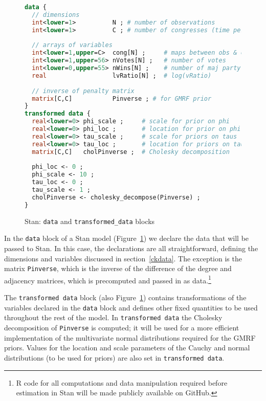 \begin{figure}[h]
\begin{lstlisting}[language=Stan, frame=trBL]
data {
  // dimensions 
  int<lower=1>          N ; # number of observations 
  int<lower=1>          C ; # number of congresses (time periods)
  
  // arrays of variables 
  int<lower=1,upper=C>  cong[N] ;     # maps between obs & congress
  int<lower=1,upper=56> nVotes[N] ;   # number of votes
  int<lower=0,upper=55> nWins[N] ;    # number of maj party victories
  real                  lvRatio[N] ;  # log(vRatio)
  
  // inverse of penalty matrix 
  matrix[C,C]           Pinverse ; # for GMRF prior
}
transformed data {
  real<lower=0> phi_scale ;     # scale for prior on phi
  real<lower=0> phi_loc ;       # location for prior on phi
  real<lower=0> tau_scale ;     # scale for priors on taus
  real<lower=0> tau_loc ;       # location for priors on taus
  matrix[C,C]   cholPinverse ;  # Cholesky decomposition 
  
  phi_loc <- 0 ;
  phi_scale <- 10 ;
  tau_loc <- 0 ;
  tau_scale <- 1 ;
  cholPinverse <- cholesky_decompose(Pinverse) ;
}
\end{lstlisting}
\caption{Stan: {\tt data} and {\tt transformed\_data} blocks}
\label{stan_data}
\end{figure}

In the {\tt data} block of a Stan model (Figure~\ref{stan_data}) we declare the data that will be passed to Stan. In this case, the declarations are all straightforward, defining the dimensions and variables discussed in section~\ref{ckdata}. The exception is the matrix {\tt Pinverse}, which is the inverse of the difference of the degree and adjacency matrices, which is precomputed and passed in as data.\footnote{R code for all  computations and data manipulation required before estimation in Stan will be made publicly available on GitHub.} 

The {\tt transformed data} block (also Figure~\ref{stan_data}) contains transformations of the variables declared in the {\tt data} block and defines other fixed quantities to be used throughout the rest of the model. In {\tt transformed data} the Cholesky decomposition of {\tt Pinverse} is computed; it will be used for a more efficient implementation of the multivariate normal distributions required for the GMRF priors. Values for the location and scale parameters of the Cauchy and normal distributions (to be used for priors) are also set in {\tt transformed data}. 


